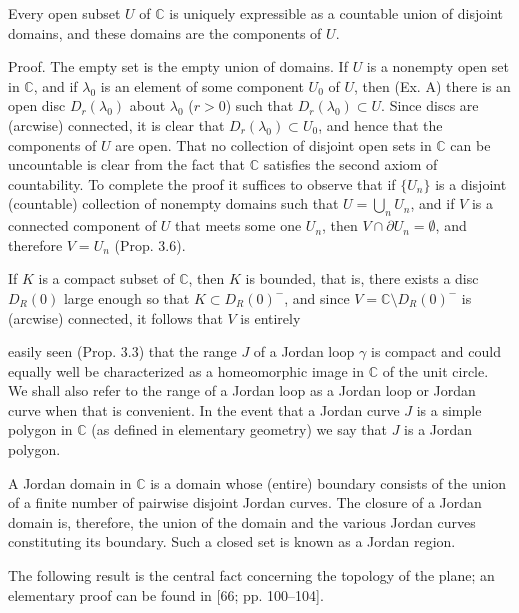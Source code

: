 Every open subset $U$ of $\mathbb{C}$ is uniquely expressible as a countable union of disjoint domains, and these domains are the components of $U$.

Proof. The empty set is the empty union of domains. If $U$ is a nonempty open set in $\mathbb{C}$, and if $\lambda_0$ is an element of some component $U_0$ of $U$, then (Ex. A) there is an open disc $D_r(\lambda_0)$ about $\lambda_0$ ($r > 0$) such that $D_r(\lambda_0) \subset U$. Since discs are (arcwise) connected, it is clear that $D_r(\lambda_0) \subset U_0$, and hence that the components of $U$ are open. That no collection of disjoint open sets in $\mathbb{C}$ can be uncountable is clear from the fact that $\mathbb{C}$ satisfies the second axiom of countability. To complete the proof it suffices to observe that if $\{U_n\}$ is a disjoint (countable) collection of nonempty domains such that $U = \bigcup_n U_n$, and if $V$ is a connected component of $U$ that meets some one $U_n$, then $V \cap \partial U_n = \emptyset$, and therefore $V = U_n$ (Prop. 3.6).

If $K$ is a compact subset of $\mathbb{C}$, then $K$ is bounded, that is, there exists a disc $D_R(0)$ large enough so that $K \subset D_R(0)^-$, and since $V = \mathbb{C} \setminus D_R(0)^-$ is (arcwise) connected, it follows that $V$ is entirely

easily seen (Prop. 3.3) that the range $J$ of a Jordan loop $\gamma$ is compact and could equally well be characterized as a homeomorphic image in $\mathbb{C}$ of the unit circle. We shall also refer to the range of a Jordan loop as a Jordan loop or Jordan curve when that is convenient. In the event that a Jordan curve $J$ is a simple polygon in $\mathbb{C}$ (as defined in elementary geometry) we say that $J$ is a Jordan polygon.

A Jordan domain in $\mathbb{C}$ is a domain whose (entire) boundary consists of the union of a finite number of pairwise disjoint Jordan curves. The closure of a Jordan domain is, therefore, the union of the domain and the various Jordan curves constituting its boundary. Such a closed set is known as a Jordan region.

The following result is the central fact concerning the topology of the plane; an elementary proof can be found in [66; pp. 100–104].
